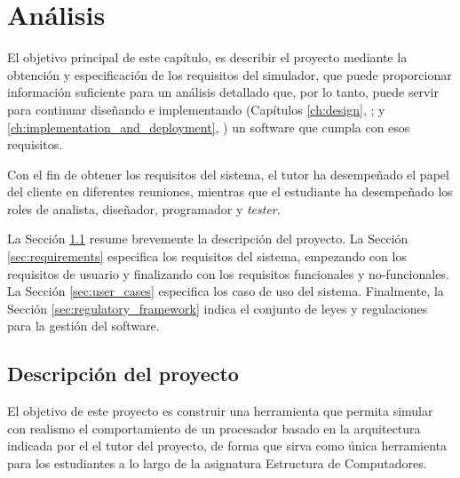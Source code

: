\chead[]{}
\renewcommand{\headrulewidth}{0.5pt}

\lfoot[]{}
\cfoot[]{}
\rfoot[]{}
\renewcommand{\footrulewidth}{0pt}

\chapter{Análisis}
\label{ch:analysis}

El objetivo principal de este capítulo, es describir el proyecto mediante la obtención y especificación de los requisitos del simulador, que puede proporcionar información suficiente para un análisis detallado que, por lo tanto, puede servir para continuar diseñando e implementando (Capítulos \ref{ch:design}, \textit{}; y \ref{ch:implementation_and_deployment}, \textit{}) un \gls{software} que cumpla con esos requisitos. 

Con el fin de obtener los requisitos del sistema, el tutor ha desempeñado el papel del cliente en diferentes reuniones, mientras que el estudiante ha desempeñado los roles de analista, diseñador, programador y \emph{tester}.

La Sección \ref{sec:project_description} resume brevemente la descripción del proyecto. La Sección \ref{sec:requirements} especifica los requisitos del sistema, empezando con los requisitos de usuario y finalizando con los requisitos funcionales y no-funcionales. La Sección \ref{sec:user_cases} especifica los caso de uso del sistema. Finalmente, la Sección \ref{sec:regulatory_framework} indica el conjunto de leyes y regulaciones para la gestión del \gls{software}.  

\section{Descripción del proyecto}
\label{sec:project_description}

El objetivo de este proyecto es construir una herramienta que permita simular con realismo el comportamiento de un procesador basado en la arquitectura indicada por el el tutor del proyecto, de forma que sirva como única herramienta para los estudiantes a lo largo de la asignatura Estructura de Computadores.

